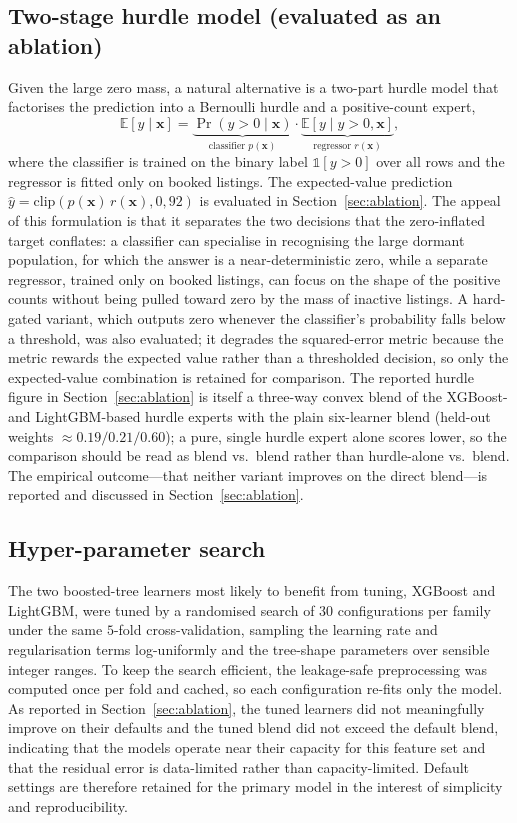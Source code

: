 \documentclass[review,12pt]{elsarticle}
\begin{document}
\subsection{Two-stage hurdle model (evaluated as an ablation)}
Given the large zero mass, a natural alternative is a two-part hurdle model that
factorises the prediction into a Bernoulli hurdle and a positive-count expert,
\begin{equation}
\mathbb E[y\mid\mathbf x]=\underbrace{\Pr(y>0\mid\mathbf x)}_{\text{classifier }p(\mathbf x)}
\cdot
\underbrace{\mathbb E[y\mid y>0,\mathbf x]}_{\text{regressor }r(\mathbf x)},
\label{eq:hurdle}
\end{equation}
where the classifier is trained on the binary label $\mathbb 1[y>0]$ over all rows
and the regressor is fitted only on booked listings. The expected-value prediction
$\hat y=\mathrm{clip}(p(\mathbf x)\,r(\mathbf x),0,92)$ is evaluated in
Section~\ref{sec:ablation}. The appeal of this formulation is that it separates the
two decisions that the zero-inflated target conflates: a classifier can specialise
in recognising the large dormant population, for which the answer is a
near-deterministic zero, while a separate regressor, trained only on booked
listings, can focus on the shape of the positive counts without being pulled toward
zero by the mass of inactive listings. A hard-gated variant, which outputs zero
whenever the classifier's probability falls below a threshold, was also evaluated;
it degrades the squared-error metric because the metric rewards the expected value
rather than a thresholded decision, so only the expected-value combination is
retained for comparison. The reported hurdle figure in Section~\ref{sec:ablation}
is itself a three-way convex blend of the XGBoost- and LightGBM-based hurdle
experts with the plain six-learner blend (held-out weights $\approx0.19/0.21/0.60$);
a pure, single hurdle expert alone scores lower, so the comparison should be read
as blend vs.\ blend rather than hurdle-alone vs.\ blend. The empirical
outcome---that neither variant improves on the direct blend---is reported and
discussed in Section~\ref{sec:ablation}.

\subsection{Hyper-parameter search}
\label{sec:hpsearch}
The two boosted-tree learners most likely to benefit from tuning, XGBoost and
LightGBM, were tuned by a randomised search of $30$ configurations per family
under the same $5$-fold cross-validation, sampling the learning rate and
regularisation terms log-uniformly and the tree-shape parameters over sensible
integer ranges. To keep the search efficient, the leakage-safe preprocessing was
computed once per fold and cached, so each configuration re-fits only the model.
As reported in Section~\ref{sec:ablation}, the tuned learners did not
meaningfully improve on their defaults and the tuned blend did not exceed the
default blend, indicating that the models operate near their capacity for this
feature set and that the residual error is data-limited rather than
capacity-limited. Default settings are therefore retained for the primary model in
the interest of simplicity and reproducibility.
\end{document}
